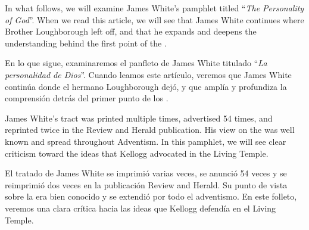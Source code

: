 



In what follows, we will examine James White’s pamphlet titled “\textit{The Personality of God}”. When we read this article, we will see that James White continues where Brother Loughborough left off, and that he expands and deepens the understanding behind the first point of the .


En lo que sigue, examinaremos el panfleto de James White titulado “\textit{La personalidad de Dios}”. Cuando leamos este artículo, veremos que James White continúa donde el hermano Loughborough dejó, y que amplía y profundiza la comprensión detrás del primer punto de los .


James White’s tract was printed multiple times, advertised 54 times, and reprinted twice in the Review and Herald publication. His view on the  was well known and spread throughout Adventism. In this pamphlet, we will see clear criticism toward the ideas that Kellogg advocated in the Living Temple.


El tratado de James White se imprimió varias veces, se anunció 54 veces y se reimprimió dos veces en la publicación Review and Herald. Su punto de vista sobre la  era bien conocido y se extendió por todo el adventismo. En este folleto, veremos una clara crítica hacia las ideas que Kellogg defendía en el Living Temple.


